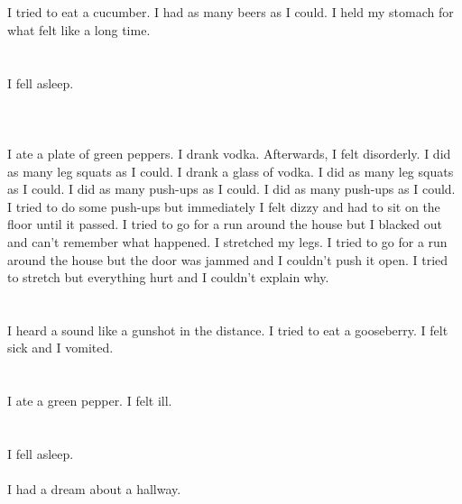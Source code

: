 \documentclass{article}
\begin{document}
    \section{}
    I tried to eat a cucumber. I had as many beers as I could. I held my stomach for what felt like a long time.  
    \newpage
    
    \section{}
    I fell asleep.\\\\ 
    \newpage
    
    \section{}
    I ate a plate of green peppers. I drank vodka. Afterwards, I felt disorderly. I did as many leg squats as I could. I drank a glass of vodka.  I did as many leg squats as I could.  I did as many push-ups as I could.  I did as many push-ups as I could.  I tried to do some push-ups but immediately I felt dizzy and had to sit on the floor until it passed.   I tried to go for a run around the house but I blacked out and can't remember what happened.  I stretched my legs.  I tried to go for a run around the house but the door was jammed and I couldn't push it open.  I tried to stretch but everything hurt and I couldn't explain why.  
    \newpage
    
    \section{}
    I heard a sound like a gunshot in the distance. I tried to eat a gooseberry. I felt sick and I vomited.  
    \newpage
    
    \section{}
    I ate a green pepper. I felt ill.  
    \newpage
    
    \section{}
    I fell asleep.\\\\I had a dream about a hallway.\\\\ 
    \newpage
    
\end{document}
